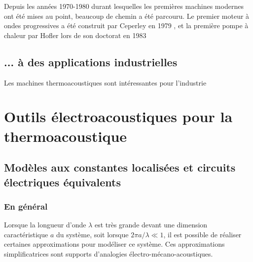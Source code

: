 Depuis les années 1970-1980 durant lesquelles les premières machines modernes ont été mises au point, beaucoup de chemin a été parcouru. Le premier moteur à ondes progressives a été construit par Ceperley en 1979 \cite{ceperley_pistonless_1979}, et la première pompe à chaleur par Hofler lors de son doctorat en 1983 

\subsection{... à des applications industrielles}
Les machines thermoacoustiques sont intéressantes pour l'industrie \cite{swift_thermoacoustics_2002, wollan_development_2002, adeff_measurement_1991, garrett_thermoacoustic_1993}

\section{Outils électroacoustiques pour la thermoacoustique}
%
%    

\subsection{Modèles aux constantes localisées et circuits électriques équivalents}

\subsubsection{En général}

Lorsque la longueur d'onde $\lambda$ est très grande devant une dimension caractéristique $a$ du système, soit lorsque $2\pi a/\lambda \ll 1$, il est possible de réaliser certaines approximations pour modéliser ce système. Ces approximations simplificatrices sont supports d'analogies électro-mécano-acoustiques. 

